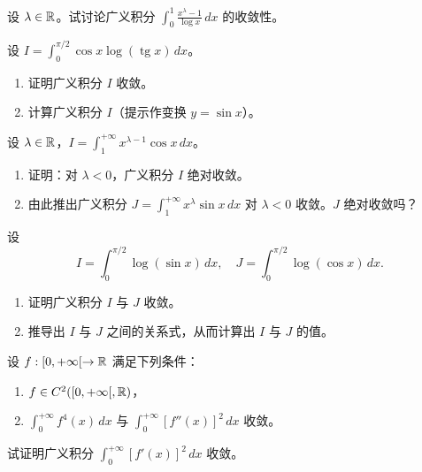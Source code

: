 \begin{exercise}
	\item 设 $\lambda\in\mathbb{R}$。试讨论广义积分 $\displaystyle\int_0^1\frac{x^{\lambda}-1}{\log x}\,dx$ 的收敛性。
\end{exercise}

\begin{exercise}
	\item 设 $I=\displaystyle\int_0^{\pi/2}\cos x\log(\operatorname{tg}x)\,dx$。
	\begin{enumerate}[label=\arabic*)]
		\item 证明广义积分 $I$ 收敛。
		\item 计算广义积分 $I$（提示作变换 $y=\sin x$）。
	\end{enumerate}
\end{exercise}

\begin{exercise}
	\item 设 $\lambda\in\mathbb{R}$，$I=\displaystyle\int_1^{+\infty}x^{\lambda-1}\cos x\,dx$。
	\begin{enumerate}[label=\arabic*)]
		\item 证明：对 $\lambda<0$，广义积分 $I$ 绝对收敛。
		\item 由此推出广义积分 $J=\displaystyle\int_1^{+\infty}x^{\lambda}\sin x\,dx$ 对 $\lambda<0$ 收敛。$J$ 绝对收敛吗？
	\end{enumerate}
\end{exercise}

\begin{exercise}
	\item 设
	\[I=\int_0^{\pi/2}\log(\sin x)\,dx,\quad J=\int_0^{\pi/2}\log(\cos x)\,dx.\]
	\begin{enumerate}[label=\arabic*)]
		\item 证明广义积分 $I$ 与 $J$ 收敛。
		\item 推导出 $I$ 与 $J$ 之间的关系式，从而计算出 $I$ 与 $J$ 的值。
	\end{enumerate}
\end{exercise}

\begin{exercise}
	\item 设 $f:[0,+\infty[\to\mathbb{R}$ 满足下列条件：
	\begin{enumerate}[label=\arabic*)]
		\item $f\in C^2([0,+\infty[,\mathbb{R})$，
		\item $\displaystyle\int_0^{+\infty}f^4(x)\,dx$ 与 $\displaystyle\int_0^{+\infty}[f''(x)]^2\,dx$ 收敛。
	\end{enumerate}
	试证明广义积分 $\displaystyle\int_0^{+\infty}[f'(x)]^2\,dx$ 收敛。
\end{exercise}

